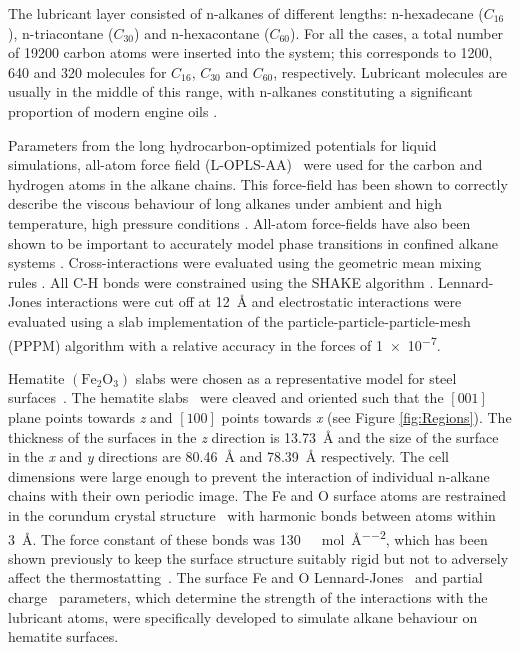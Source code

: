 \documentclass[5p]{elsarticle}
\begin{document}
The lubricant layer consisted of n-alkanes of different lengths: n-hexadecane ($C_{16}$), n-triacontane ($C_{30}$) and n-hexacontane ($C_{60}$). For all the cases, a  total number of 19200 carbon atoms were inserted into the system; this corresponds to 1200, 640 and 320 molecules for $C_{16}$, $C_{30}$ and $C_{60}$, respectively. Lubricant molecules are usually in the middle of this range, with n-alkanes constituting a significant proportion of modern engine oils \cite{Liang2018}.

Parameters from the long hydrocarbon-optimized potentials for liquid simulations, all-atom force field (L-OPLS-AA)~\cite{Jorgensen1996,Siu2012} were used for the carbon and hydrogen atoms in the alkane chains. This force-field has been shown to correctly describe the viscous behaviour of long alkanes under ambient and high temperature, high pressure conditions \cite{Ewen2016a}. All-atom force-fields have also been shown to be important to accurately model phase transitions in confined alkane systems \cite{Docherty2010}. Cross-interactions were evaluated using the geometric mean mixing rules \cite{Jorgensen1996}. All C-H bonds were constrained using the SHAKE algorithm \cite{Ryckaert1977}. Lennard-Jones interactions were cut off at \SI{12}{\angstrom} and electrostatic interactions were evaluated using a slab implementation of the particle-particle-particle-mesh (PPPM) algorithm \cite{Yeh1999} with a relative accuracy in the forces of \SI{1e-7}{}.

Hematite $\left(\text{Fe}_2\text{O}_3\right)$ slabs were chosen as a representative model for steel surfaces~\cite{Oh1998}. The hematite  slabs~\cite{Maslen1994} were cleaved and oriented such that the $\left[001\right]$ plane points towards \emph{z} and $\left[100\right]$ points towards \emph{x} (see Figure \ref{fig:Regions}). The thickness of the surfaces in the \emph{z} direction is \SI{13.73}{\angstrom} and the size of the surface in the \emph{x} and \emph{y} directions are \SI{80.46}{\angstrom} and \SI{78.39}{\angstrom} respectively. The cell dimensions were large enough to prevent the interaction of individual n-alkane chains with their own periodic image. The Fe and O surface atoms are restrained in the corundum crystal structure~\cite{Maslen1994} with harmonic bonds between atoms within \SI{3}{\angstrom}. The force constant of these bonds was  \SI{130}{\kilo\calorie\per\mol\per\angstrom\squared}, which has been shown previously to keep the surface structure suitably rigid but not to adversely affect the thermostatting~\cite{Berro2010}. The surface Fe and O Lennard-Jones~\cite{Savio2012} and partial charge~\cite{Berro2010} parameters, which determine the strength of the interactions with the lubricant atoms, were specifically developed to simulate alkane behaviour on hematite surfaces.
\end{document}
